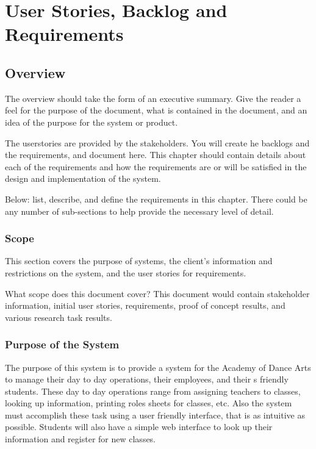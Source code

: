 \chapter{User Stories, Backlog and Requirements}
\section{Overview}


The overview should take the form of an executive summary.  Give the reader a feel 
for the purpose of the document, what is contained in the document, and an idea 
of the purpose for the system or product. 

 The userstories 
are provided by the stakeholders.  You will create he backlogs and the requirements, and document here.  
This chapter should contain 
details about each of the requirements and how the requirements are or will be 
satisfied in the design and implementation of the system.

Below:   list, describe, and define the requirements in this chapter.  
There could be any number of sub-sections to help provide the necessary level of 
detail. 





\subsection{Scope}

This section covers the purpose of systems, the client's information and restrictions on the system, and the user stories for requirements.

What scope does this document cover?  This document would contain stakeholder information, 
initial user stories, requirements, proof of concept results, and various research 
task results. 



\subsection{Purpose of the System}
The purpose of this system is to provide a system for the Academy of Dance Arts to manage their day to day operations, their employees, and their s friendly students. These day to day operations range from assigning teachers to classes, looking up information, printing roles sheets for classes, etc.  Also the system must accomplish these task using a user friendly interface, that is as intuitive as possible. Students will also have a simple web interface to look up their information and register for new classes.


